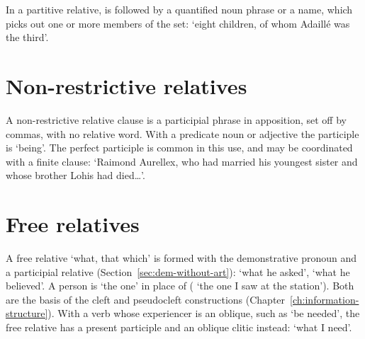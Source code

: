 In a partitive relative,  is followed by a quantified noun phrase or a name, which picks out one or more members of the set:  `eight children, of whom Adaillé was the third'.

\section{Non-restrictive relatives}\label{sec:nonrestrictive}
A non-restrictive relative clause is a participial phrase in apposition, set off by commas, with no relative word. With a predicate noun or adjective the participle is  `being'.
The perfect participle is common in this use, and may be coordinated with a finite  clause:  `Raimond Aurellex, who had married his youngest sister and whose brother Lohis had died\ldots'.

\section{Free relatives}\label{sec:free-relatives}
A free relative `what, that which' is formed with the demonstrative pronoun  and a participial relative (Section~\ref{sec:dem-without-art}):  `what he asked',  `what he believed'. A person is  `the one' in place of  ( `the one I saw at the station'). Both are the basis of the cleft and pseudocleft constructions (Chapter~\ref{ch:information-structure}).
With a verb whose experiencer is an oblique, such as  `be needed', the free relative has a present participle and an oblique clitic instead:  `what I need'.


